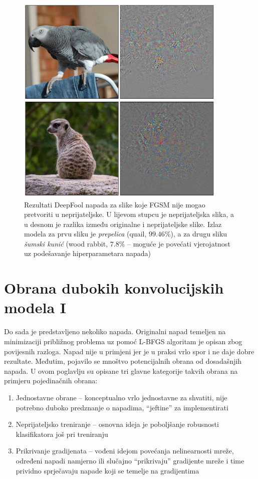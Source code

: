 \documentclass[utf8, diplomski]{fer}
\begin{document}
\begin{figure}[H]
\centering
\includegraphics[width=0.9\textwidth,keepaspectratio]{img/results/deepfool_hard.png}
\caption{Rezultati DeepFool napada za slike koje FGSM nije mogao pretvoriti u neprijateljske. U lijevom stupcu je neprijateljska slika, a u desnom je razlika između originalne i neprijateljske slike. Izlaz modela za prvu sliku je \textit{prepelica} (quail, $99.46\%$), a za drugu sliku \textit{šumski kunić} (wood rabbit, $7.8\%$ -- moguće je povećati vjerojatnost uz podešavanje hiperparametara napada)}
\end{figure}\label{deepfool_hard}


\chapter{Obrana dubokih konvolucijskih modela I}
Do sada je predstavljeno nekoliko napada. Originalni napad temeljen na minimizaciji približnog problema uz pomoć L-BFGS algoritam je opisan zbog povijesnih razloga. Napad nije u primjeni jer je u praksi vrlo spor i ne daje dobre rezultate. Međutim, pojavilo se mnoštvo potencijalnih obrana od dosadašnjih napada. U ovom poglavlju su opisane tri glavne kategorije takvih obrana na primjeru pojedinačnih obrana: 
\begin{enumerate}[noitemsep, label=\textbullet]
\item Jednostavne obrane -- konceptualno vrlo jednostavne za shvatiti, nije potrebno duboko predznanje o napadima, ``jeftine'' za implementirati
\item Neprijateljsko treniranje -- osnovna ideja je poboljšanje robusnosti klasifikatora još pri treniranju
\item Prikrivanje gradijenata -- vođeni idejom povećanja nelinearnosti mreže, određeni napadi namjerno ili slučajno ``prikrivaju'' gradijente mreže i time prividno sprječavaju napade koji se temelje na gradijentima
\end{enumerate}
\end{document}
